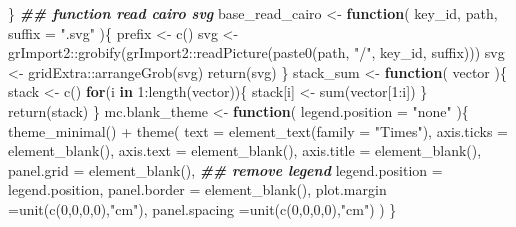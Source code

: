 \documentclass[
]{article}
\newenvironment{Shaded}{\begin{snugshade}}{\end{snugshade}}
\newcommand{\AttributeTok}[1]{\textcolor[rgb]{0.77,0.63,0.00}{#1}}
\newcommand{\ControlFlowTok}[1]{\textcolor[rgb]{0.13,0.29,0.53}{\textbf{#1}}}
\newcommand{\DecValTok}[1]{\textcolor[rgb]{0.00,0.00,0.81}{#1}}
\newcommand{\DocumentationTok}[1]{\textcolor[rgb]{0.56,0.35,0.01}{\textbf{\textit{#1}}}}
\newcommand{\FunctionTok}[1]{\textcolor[rgb]{0.00,0.00,0.00}{#1}}
\newcommand{\NormalTok}[1]{#1}
\newcommand{\OtherTok}[1]{\textcolor[rgb]{0.56,0.35,0.01}{#1}}
\newcommand{\SpecialCharTok}[1]{\textcolor[rgb]{0.00,0.00,0.00}{#1}}
\newcommand{\StringTok}[1]{\textcolor[rgb]{0.31,0.60,0.02}{#1}}
\begin{document}
\begin{Shaded}
\begin{Highlighting}[]
\NormalTok{  \}}
\DocumentationTok{\#\# function read cairo svg}
\NormalTok{base\_read\_cairo }\OtherTok{\textless{}{-}}
  \ControlFlowTok{function}\NormalTok{(}
\NormalTok{           key\_id,}
\NormalTok{           path,}
           \AttributeTok{suffix =} \StringTok{".svg"}
\NormalTok{           )\{}
\NormalTok{    prefix }\OtherTok{\textless{}{-}} \FunctionTok{c}\NormalTok{()}
\NormalTok{    svg }\OtherTok{\textless{}{-}}\NormalTok{ grImport2}\SpecialCharTok{::}\FunctionTok{grobify}\NormalTok{(grImport2}\SpecialCharTok{::}\FunctionTok{readPicture}\NormalTok{(}\FunctionTok{paste0}\NormalTok{(path, }\StringTok{"/"}\NormalTok{, key\_id, suffix)))}
\NormalTok{    svg }\OtherTok{\textless{}{-}}\NormalTok{ gridExtra}\SpecialCharTok{::}\FunctionTok{arrangeGrob}\NormalTok{(svg)}
    \FunctionTok{return}\NormalTok{(svg)}
\NormalTok{  \}}
\NormalTok{stack\_sum }\OtherTok{\textless{}{-}}
  \ControlFlowTok{function}\NormalTok{(}
\NormalTok{           vector}
\NormalTok{           )\{}
\NormalTok{    stack }\OtherTok{\textless{}{-}} \FunctionTok{c}\NormalTok{()}
    \ControlFlowTok{for}\NormalTok{(i }\ControlFlowTok{in} \DecValTok{1}\SpecialCharTok{:}\FunctionTok{length}\NormalTok{(vector))\{}
\NormalTok{      stack[i] }\OtherTok{\textless{}{-}} \FunctionTok{sum}\NormalTok{(vector[}\DecValTok{1}\SpecialCharTok{:}\NormalTok{i])}
\NormalTok{    \}}
    \FunctionTok{return}\NormalTok{(stack)}
\NormalTok{  \}}
\NormalTok{mc.blank\_theme }\OtherTok{\textless{}{-}} 
  \ControlFlowTok{function}\NormalTok{(}
           \AttributeTok{legend.position =} \StringTok{"none"}
\NormalTok{           )\{}
    \FunctionTok{theme\_minimal}\NormalTok{() }\SpecialCharTok{+}
      \FunctionTok{theme}\NormalTok{(}
            \AttributeTok{text =} \FunctionTok{element\_text}\NormalTok{(}\AttributeTok{family =} \StringTok{"Times"}\NormalTok{),}
            \AttributeTok{axis.ticks =} \FunctionTok{element\_blank}\NormalTok{(),}
            \AttributeTok{axis.text =} \FunctionTok{element\_blank}\NormalTok{(),}
            \AttributeTok{axis.title =} \FunctionTok{element\_blank}\NormalTok{(),}
            \AttributeTok{panel.grid =} \FunctionTok{element\_blank}\NormalTok{(),}
            \DocumentationTok{\#\# remove legend}
            \AttributeTok{legend.position =}\NormalTok{ legend.position,}
            \AttributeTok{panel.border =} \FunctionTok{element\_blank}\NormalTok{(),}
            \AttributeTok{plot.margin =}\FunctionTok{unit}\NormalTok{(}\FunctionTok{c}\NormalTok{(}\DecValTok{0}\NormalTok{,}\DecValTok{0}\NormalTok{,}\DecValTok{0}\NormalTok{,}\DecValTok{0}\NormalTok{),}\StringTok{"cm"}\NormalTok{),}
            \AttributeTok{panel.spacing =}\FunctionTok{unit}\NormalTok{(}\FunctionTok{c}\NormalTok{(}\DecValTok{0}\NormalTok{,}\DecValTok{0}\NormalTok{,}\DecValTok{0}\NormalTok{,}\DecValTok{0}\NormalTok{),}\StringTok{"cm"}\NormalTok{)}
\NormalTok{      )}
\NormalTok{  \}}
\end{Highlighting}
\end{Shaded}
\end{document}
